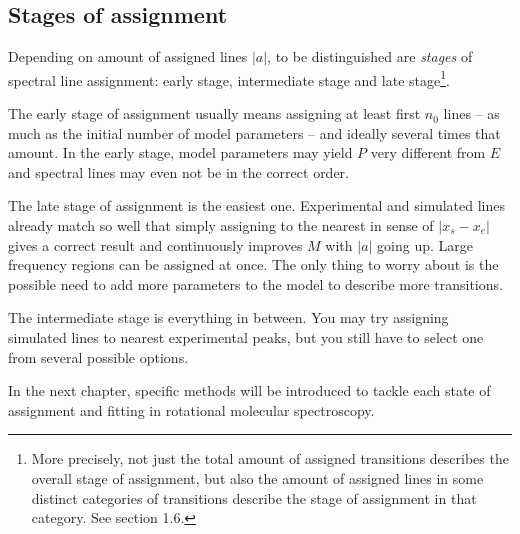 \documentclass[11pt]{article}
\begin{document}


\subsection{Stages of assignment}

Depending on amount of assigned lines $|a|$, to be distinguished are \emph{stages} of spectral line assignment: early stage, intermediate stage and late stage\footnote{More precisely, not just the total amount of assigned transitions describes the overall stage of assignment, but also the amount of assigned lines in some distinct categories of transitions describe the stage of assignment in that category. See section 1.6.}.

The early stage of assignment usually means assigning at least first $n_0$ lines -- as much as the initial number of model parameters -- and ideally several times that amount. In the early stage, model parameters may yield $P$ very different from $E$ and spectral lines may even not be in the correct order. 

The late stage of assignment is the easiest one. Experimental and simulated lines already match so well that simply assigning to the nearest in sense of $|x_s - x_e|$ gives a correct result and continuously improves $M$ with $|a|$ going up. Large frequency regions can be assigned at once. The only thing to worry about is the possible need to add more parameters to the model to describe more transitions.  

The intermediate stage is everything in between. You may try assigning simulated lines to nearest experimental peaks, but you still have to select one from several possible options.

In the next chapter, specific methods will be introduced to tackle each state of assignment and fitting in rotational molecular spectroscopy.
\end{document}
